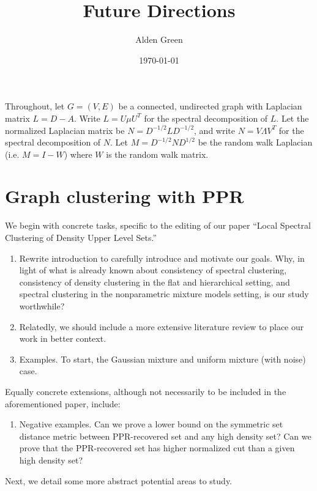 \documentclass{article}
\newcommand{\1}{\mathbb{I}}
\theoremstyle{alden}
\theoremstyle{aldenthm}
\theoremstyle{definition}
\theoremstyle{remark}
\begin{document}
\title{Future Directions}
\author{Alden Green}
\date{\today}
\maketitle

Throughout, let $G = (V,E)$ be a connected, undirected graph with Laplacian matrix $L = D - A$. Write $L = U \mu U^T$ for the spectral decomposition of $L$. Let the normalized Laplacian matrix be $N = D^{-1/2} L D^{-1/2}$, and write $N = V \Lambda V^T$ for the spectral decomposition of $N$. Let $M = D^{-1/2}ND^{1/2}$ be the random walk Laplacian (i.e. $M = I - W$) where $W$ is the random walk matrix.

\section{Graph clustering with \textrm{PPR}}

We begin with concrete tasks, specific to the editing of our paper ``Local Spectral Clustering of Density Upper Level Sets.'' 

\begin{enumerate}
	\item Rewrite introduction to carefully introduce and motivate our goals. Why, in light of what is already known about consistency of spectral clustering, consistency of density clustering in the flat and hierarchical setting, and spectral clustering in the nonparametric mixture models setting, is our study worthwhile?
	\item Relatedly, we should include a more extensive literature review to place our work in better context.
	\item Examples. To start, the Gaussian mixture and uniform mixture (with noise) case. 
\end{enumerate}

Equally concrete extensions, although not necessarily to be included in the aforementioned paper, include:

\begin{enumerate}
	\item Negative examples. Can we prove a lower bound on the symmetric set distance metric between \textrm{PPR}-recovered set and any high density set? Can we prove that the \textrm{PPR}-recovered set has higher normalized cut than a given high density set?
\end{enumerate}

Next, we detail some more abstract potential areas to study.
\end{document}
